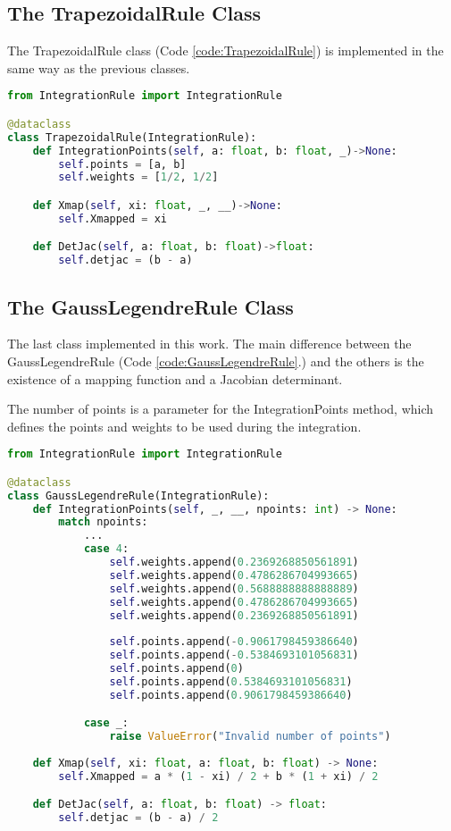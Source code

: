 \subsection{The TrapezoidalRule Class}
The TrapezoidalRule class (Code \ref{code:TrapezoidalRule}) is implemented in the same way as the previous classes.
\begin{lstlisting}[language=python, caption={TrapezoidalRule Class.}, label={code:TrapezoidalRule}]
from IntegrationRule import IntegrationRule

@dataclass
class TrapezoidalRule(IntegrationRule):
    def IntegrationPoints(self, a: float, b: float, _)->None:
        self.points = [a, b]
        self.weights = [1/2, 1/2]

    def Xmap(self, xi: float, _, __)->None:
        self.Xmapped = xi

    def DetJac(self, a: float, b: float)->float:
        self.detjac = (b - a)
\end{lstlisting}

\subsection{The GaussLegendreRule Class}
The last class implemented in this work. The main difference between the GaussLegendreRule (Code \ref{code:GaussLegendreRule}.) and the others is the existence of a mapping function and a Jacobian determinant. 

The number of points is a parameter for the IntegrationPoints method, which defines the points and weights to be used during the integration.
\begin{lstlisting}[language=python, caption={GaussLegendreRule Class.}, label={code:GaussLegendreRule}]
from IntegrationRule import IntegrationRule

@dataclass
class GaussLegendreRule(IntegrationRule):
    def IntegrationPoints(self, _, __, npoints: int) -> None:
        match npoints:
            ...
            case 4:
                self.weights.append(0.2369268850561891)
                self.weights.append(0.4786286704993665)
                self.weights.append(0.5688888888888889)
                self.weights.append(0.4786286704993665)
                self.weights.append(0.2369268850561891)
                
                self.points.append(-0.9061798459386640)
                self.points.append(-0.5384693101056831)
                self.points.append(0)
                self.points.append(0.5384693101056831)
                self.points.append(0.9061798459386640)

            case _:
                raise ValueError("Invalid number of points")
            
    def Xmap(self, xi: float, a: float, b: float) -> None:
        self.Xmapped = a * (1 - xi) / 2 + b * (1 + xi) / 2

    def DetJac(self, a: float, b: float) -> float:
        self.detjac = (b - a) / 2
\end{lstlisting}

